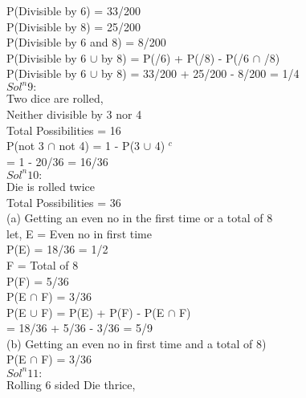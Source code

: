 \documentclass{article}
\begin{document}
P(Divisible by 6) = 33/200 \\
P(Divisible by 8) = 25/200 \\
P(Divisible by 6 and 8) = 8/200 \\

P(Divisible by 6 $\cup$ by 8) = P(/6) + P(/8) - P(/6 $\cap$ /8) \\

P(Divisible by 6 $\cup$ by 8) = 33/200 + 25/200 - 8/200 = 1/4 \\

\textbf{$Sol^n 9:$} \\

Two dice are rolled, \\
Neither divisible by 3 nor 4 \\
Total Possibilities = 16 \\

P(not 3 $\cap$ not 4) = 1 - P(3 $\cup$ 4) $^c$ \\
= 1 - 20/36 = 16/36 \\

\textbf{$Sol^n 10:$} \\

Die is rolled twice \\
Total Possibilities =  36 \\

(a) Getting an even no in the first time or a total of 8 \\
let, E = Even no in first time \\
P(E) = 18/36 = 1/2 \\

F = Total of 8 \\

P(F) = 5/36 \\

P(E $\cap$ F) = 3/36 \\

P(E $\cup$ F) = P(E) + P(F) - P(E $\cap$ F) \\
= 18/36 + 5/36 - 3/36 = 5/9 \\

(b) Getting an even no in first time and a total of 8) \\

P(E $\cap$ F) = 3/36 \\

\textbf{$Sol^n 11:$} \\

Rolling 6 sided Die thrice, \\
\end{document}
